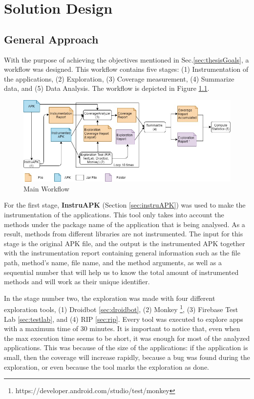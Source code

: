 \chapter{Solution Design} %
\label{Chapter3} %
\section{General Approach} \label{sec:generalApproach}

With the purpose of achieving the objectives mentioned in Sec.\ref{sec:thesisGoals}, a workflow was designed. This workflow contains five stages: (1) Instrumentation of the applications, (2) Exploration, (3) Coverage measurement, (4) Summarize data, and (5)  Data Analysis. The workflow is depicted in Figure \ref{fig:workflow}.

\begin{figure}[h]
\centering
\includegraphics[width=\textwidth]{../Figures/workflow.jpg}
\caption{Main Workflow}\label{fig:workflow}
\end{figure}

For the first stage, \textbf{InstruAPK} (Section \ref{sec:instruAPK}) was used to make the instrumentation of the applications. This tool only takes into account the methods under the package name of the application that is being analysed. As a result, methods from different libraries are not instrumented. The input for this stage is the original APK file, and the output is the instrumented APK together with the instrumentation report containing general information such as the file path, method's name, file name, and the method arguments, as well as a sequential number that will help us to know the total amount of instrumented methods and will work as their unique identifier.

In the stage number two, the exploration was made with four different exploration tools, (1) Droidbot \ref{sec:droidbot}, (2) Monkey \footnote{https://developer.android.com/studio/test/monkey}, (3) Firebase Test Lab \ref{sec:testlab}, and (4) RIP \ref{sec:rip}. Every tool was executed to explore  apps with a maximum time of 30 minutes. It is important to notice that, even when the max execution time seems to be short, it was enough for most of the analyzed applications. This was because of the size of the applications: if the application is small, then the coverage will increase rapidly, because a bug was found during the exploration, or even because the tool marks the exploration as done. 

